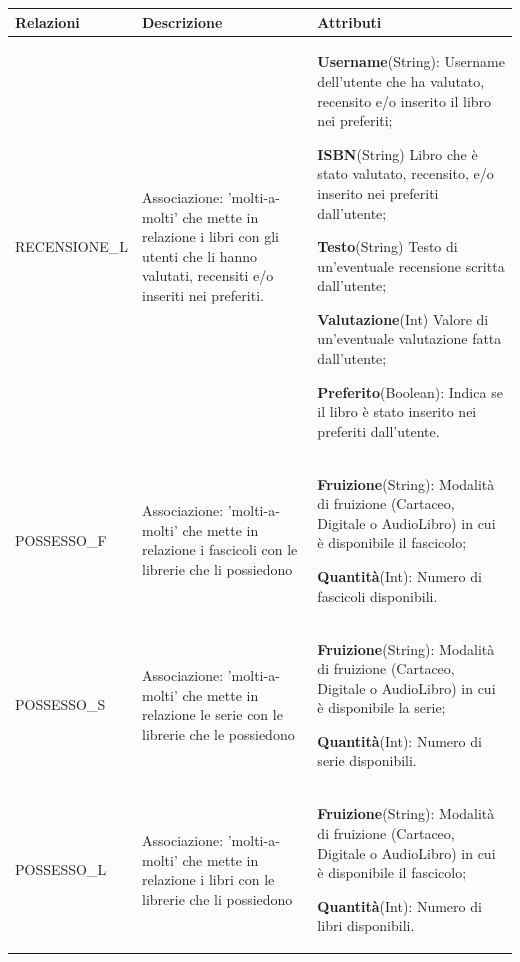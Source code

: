 \documentclass{article}
\begin{document}
\newpage
\begin{table}[h]
\centering
\begin{tabular}{|p{3cm}|p{5cm}|p{6cm}|}
    \hline
    \textbf{Relazioni} & \textbf{Descrizione} & \textbf{Attributi} \\\hline

    RECENSIONE\_L & Associazione: 'molti-a-molti' che mette in relazione i libri con gli utenti che li hanno valutati, recensiti e/o inseriti nei preferiti. & \textbf{Username}(String): Username dell'utente che ha valutato, recensito e/o inserito il libro nei preferiti; \par
    \textbf{ISBN}(String) Libro che è stato valutato, recensito, e/o inserito nei preferiti dall'utente; \par 
    \textbf{Testo}(String) Testo di un'eventuale recensione scritta dall'utente; \par
    \textbf{Valutazione}(Int) Valore di un'eventuale valutazione fatta dall'utente; \par
    \textbf{Preferito}(Boolean): Indica se il libro è stato inserito nei preferiti dall'utente.\\\hline

    POSSESSO\_F & Associazione: 'molti-a-molti' che mette in relazione i fascicoli con le librerie che li possiedono & \textbf{Fruizione}(String): Modalità di fruizione (Cartaceo, Digitale o AudioLibro) in cui è disponibile il fascicolo; \par
    \textbf{Quantità}(Int): Numero di fascicoli disponibili.\\\hline

    POSSESSO\_S & Associazione: 'molti-a-molti' che mette in relazione le serie con le librerie che le possiedono & \textbf{Fruizione}(String): Modalità di fruizione (Cartaceo, Digitale o AudioLibro) in cui è disponibile la serie; \par
    \textbf{Quantità}(Int): Numero di serie disponibili.\\\hline

    POSSESSO\_L & Associazione: 'molti-a-molti' che mette in relazione i libri con le librerie che li possiedono & \textbf{Fruizione}(String): Modalità di fruizione (Cartaceo, Digitale o AudioLibro) in cui è disponibile il fascicolo; \par
    \textbf{Quantità}(Int): Numero di libri disponibili.\\\hline
\end{tabular}
\end{table}
\end{document}
